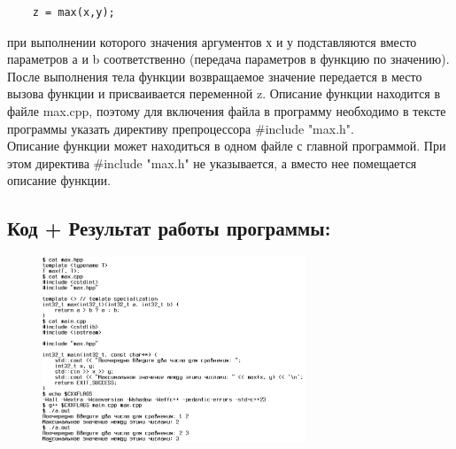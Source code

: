 \documentclass[14pt,a4paper]{article}
\begin{document}
\begin{enumerate}
    \begin{verbatim}
    z = max(x,y);
    \end{verbatim}
    при выполнении которого значения аргументов х и у подставляются вместо
    параметров а и b соответственно (передача параметров в функцию по
    значению). После выполнения тела функции возвращаемое значение передается в
    место вызова функции и присваивается переменной z. Описание функции
    находится в файле max.cpp, поэтому для включения файла в программу
    необходимо в тексте программы указать директиву препроцессора \#include
    "max.h".\\
    Описание функции может находиться в одном файле с главной программой. При
    этом директива \#include "max.h" не указывается, а вместо нее помещается
    описание функции.
\end{enumerate}
\subsection{Код + Результат работы программы:}
\begin{figure}[H]
  \includegraphics[width=0.7\textwidth]{data/demo20_1.png}
\end{figure}
\end{document}
